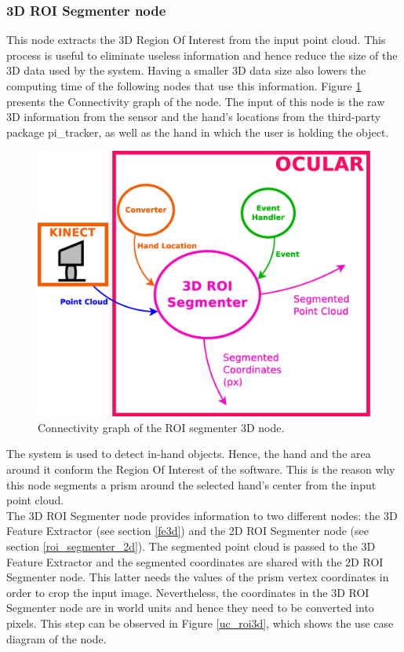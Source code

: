 	

\subsubsection{3D ROI Segmenter node}
	\label{roi_segmenter_3d}

	This node extracts the 3D Region Of Interest from the input point cloud. 
	This process is useful to eliminate useless information and hence reduce the size of the 3D data used by the system.  
	Having a smaller 3D data size also lowers the computing time of the following nodes that use this information. 
	Figure  \ref{node_roi3d} presents the Connectivity graph of the node. 
	The input of this node is the raw 3D information from the sensor and the hand's locations from the third-party package pi\_tracker, as well as the hand in which the user is holding the object. 

		\begin{figure}[H]
			\begin{center}
			\includegraphics[width=0.5\linewidth]{img/diagrams/node_roi3d.eps}
			\caption[ROI segmenter 3D node I/O]{Connectivity graph of the ROI segmenter 3D node.}		
			\label{node_roi3d}
			\end{center}
		\end{figure}


	The system is used to detect in-hand objects. 
	Hence, the hand and the area around it conform the Region Of Interest of the software. 
	This is the reason why this node segments a prism around the selected hand's center from the input point cloud.
	\\

	The 3D ROI Segmenter node provides information to two different nodes: the 3D Feature Extractor (see section \ref{fe3d}) and the 2D ROI Segmenter node (see section \ref{roi_segmenter_2d}). 
	The segmented point cloud is passed to the 3D Feature Extractor and the segmented coordinates are shared with the 2D ROI Segmenter node. 
	This latter needs the values of the prism vertex coordinates in order to crop the input image. 
	Nevertheless, the coordinates in the 3D ROI Segmenter node are in world units and hence they need to be converted into pixels. 
	This step can be observed in Figure \ref{uc_roi3d}, which shows the use case diagram of the node. 
	

